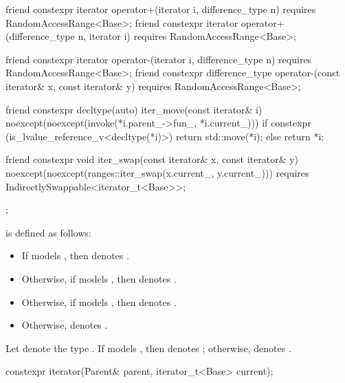 \begin{codeblock}
{{    friend constexpr iterator operator+(iterator i, difference_type n)
      requires RandomAccessRange<Base>;
    friend constexpr iterator operator+(difference_type n, iterator i)
      requires RandomAccessRange<Base>;

    friend constexpr iterator operator-(iterator i, difference_type n)
      requires RandomAccessRange<Base>;
    friend constexpr difference_type operator-(const iterator& x, const iterator& y)
      requires RandomAccessRange<Base>;

    friend constexpr decltype(auto) iter_move(const iterator& i)
      noexcept(noexcept(invoke(*i.parent_->fun_, *i.current_)))
    {
      if constexpr (is_lvalue_reference_v<decltype(*i)>)
        return std::move(*i);
      else
        return *i;
    }

    friend constexpr void iter_swap(const iterator& x, const iterator& y)
      noexcept(noexcept(ranges::iter_swap(x.current_, y.current_)))
      requires IndirectlySwappable<iterator_t<Base>>;
  };
}
\end{codeblock}

\pnum
{} is defined as follows:
\begin{itemize}
\item If  models , then
 denotes .

\item Otherwise, if  models , then
 denotes .

\item Otherwise, if  models , then
 denotes .

\item Otherwise,  denotes .
\end{itemize}

\pnum
Let  denote the type
.
If  models ,
then  denotes
; otherwise,
 denotes .

\begin{itemdecl}
constexpr iterator(Parent& parent, iterator_t<Base> current);
\end{itemdecl}

